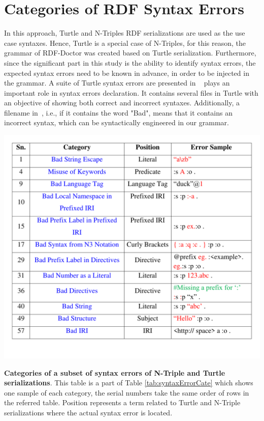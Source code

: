 \section{Categories of RDF Syntax Errors}

In this approach, Turtle and N-Triples RDF serializations are used as the use case syntaxes. 
Hence, Turtle is a special case of N-Triples, for this reason, the grammar of RDF-Doctor was created based on Turtle serialization. 
Furthermore, since the significant part in this study is the ability to identify syntax errors, the expected syntax errors need to be known in advance, in order to be injected in the grammar. 
A suite of Turtle syntax errors are presented in ~\cite{TurtleTests:Online} plays an important role in syntax errors declaration. It contains several files in Turtle with an objective of showing both correct and incorrect syntaxes. Additionally, a filename in~\cite{TurtleTests:Online}, i.e., if it contains the word "Bad", means that it contains an incorrect syntax, which can be syntactically engineered in our grammar.

 \begin{table}[tbp]
 	\centering
\includegraphics[width=5.5in]{images/TrimmedBigTable.pdf}
		\setlength\abovecaptionskip{-10mm}
	\caption{\textbf{Categories of a subset of syntax errors of N-Triple and Turtle serializations}.
	This table is a part of Table \ref{tab:syntaxErrorCate} which shows one sample of each category, the serial numbers take the same order of rows in the referred table. 
	Position represents a term related to Turtle and N-Triple serializations where the actual syntax error is located.}
	\label{tab:trimmedTable}
\end{table}


